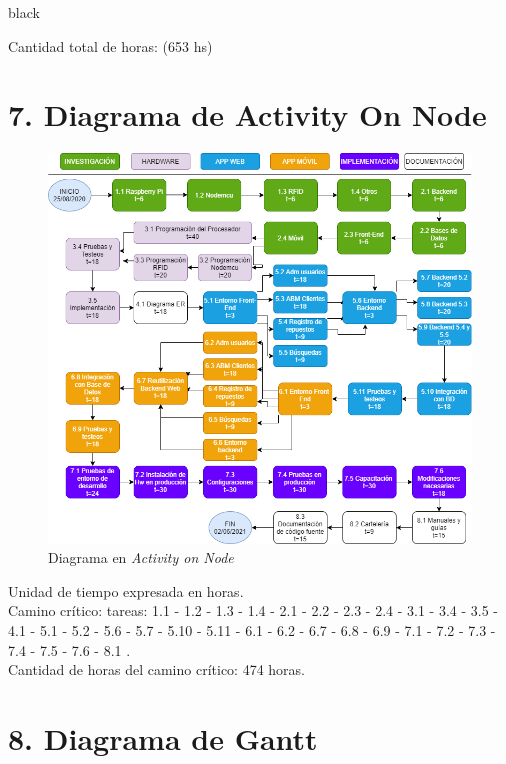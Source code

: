 \documentclass[11pt]{charter}
\begin{document}
\begin{consigna}{black}
\begin{enumerate}
\end{enumerate}

Cantidad total de horas: (653 hs)


\end{consigna}

\section{7. Diagrama de Activity On Node}
\label{sec:AoN}

\begin{figure}[htpb]
\centering 
\includegraphics[width=.9\textwidth]{./Figuras/AoN.png}
\caption{Diagrama en \textit{Activity on Node}}
\label{fig:AoN}
\end{figure}

Unidad de tiempo expresada en horas.
\\Camino crítico: tareas: 1.1 - 1.2 - 1.3 - 1.4 - 2.1 - 2.2 - 2.3 - 2.4 - 3.1 - 3.4 - 3.5 - 4.1 - 5.1 - 5.2 - 5.6 - 5.7 - 5.10 - 5.11 - 6.1 - 6.2 - 6.7 - 6.8 - 6.9 - 7.1 - 7.2 - 7.3 - 7.4 - 7.5 - 7.6 - 8.1 .
\\Cantidad de horas del camino crítico: 474 horas.


\section{8. Diagrama de Gantt}
\label{sec:gantt}
\end{document}

